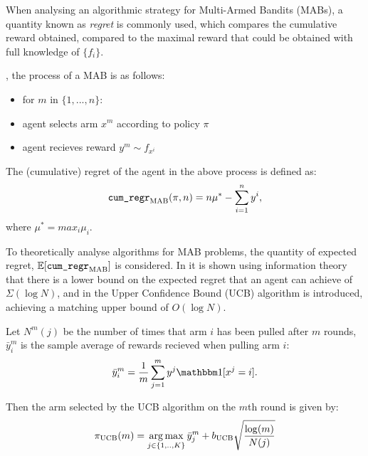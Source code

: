     When analysing an algorithmic strategy for Multi-Armed Bandits (MABs), a quantity known as \textit{regret} is commonly used, which compares the cumulative reward obtained, compared to the maximal reward that could be obtained with full knowledge of $\{f_i\}$.


    , the process of a MAB is as follows:
    \begin{itemize}
        \item for $m$ in $\{1,...,n\}$:
        \item agent selects arm $x^m$ according to policy $\pi$
        \item agent recieves reward $y^m \sim f_{x^i}$
    \end{itemize}

    \begin{defn}
        The \textnormal{(cumulative) regret} of the agent in the above process is defined as:
        \begin{align}
            {\textnormal{\texttt{cum\_regr}}}_{{\textnormal{MAB}}}(\pi,n) = n\mu^* - \sum_{i=1}^n y^i,
        \end{align}
        where $\mu^* = max_i \mu_i$.
    \end{defn}

    To theoretically analyse algorithms for MAB problems, the quantity of expected regret, $\mathbb{E}[{\textnormal{\texttt{cum\_regr}}}_{{\textnormal{MAB}}}]$ is considered. In  it is shown using information theory that there is a lower bound on the expected regret that an agent can achieve of $\Sigma(\log N)$, and in  the Upper Confidence Bound (UCB) algorithm is introduced, achieving a matching upper bound of $O(\log N)$. 

    Let $N^m(j)$ be the number of times that arm $i$ has been pulled after $m$ rounds, $\bar{y}_i^m$ is the sample average of rewards recieved when pulling arm $i$: 
    \begin{align}
        \bar{y}_i^m=\frac{1}{m}\sum_{j=1}^m y^j \one[x^j=i].
    \end{align} 
    
    Then the arm selected by the UCB algorithm on the $m$th round is given by:
    \begin{align}
        \pi_{{\textnormal{UCB}}}(m) = \operatorname*{arg\,max}_{j\in\{1,..,K\}} \bar{y}_j^m + b_{{\textnormal{UCB}}} \sqrt{\frac{\log(m)}{N(j)}} 
    \end{align}

